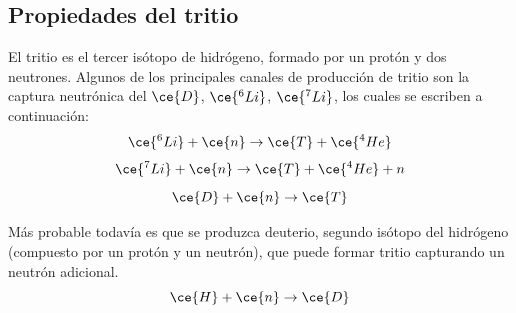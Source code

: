 \subsection{Propiedades del tritio}

El tritio  es el tercer isótopo de hidrógeno, formado por un protón y dos neutrones. Algunos de los principales canales de producción de tritio son la captura neutrónica del $\ce{D}$, $\ce{^6Li}$, $\ce{^7Li}$,  los cuales se escriben a continuación:
\begin{equation}
\ce{^{6}Li} +  \ce{n} \rightarrow \ce{T} + \ce{^{4}He}
\label{capneuLi6}
\end{equation}
\begin{equation}
\ce{^{7}Li} + \ce{n} \rightarrow  \ce{T} + \ce{^{4}He} + n
\label{capneuLi7}
\end{equation}
\begin{equation}
\ce{D} +  \ce{n} \rightarrow  \ce{T}  
\label{capneuH}
\end{equation}

Más probable todavía es que se produzca deuterio, segundo isótopo del hidrógeno (compuesto por un protón y un neutrón), que puede formar tritio capturando un neutrón adicional. 
\begin{equation}
\ce{H} +  \ce{n} \rightarrow  \ce{D}  
\label{capneuD}
\end{equation}


